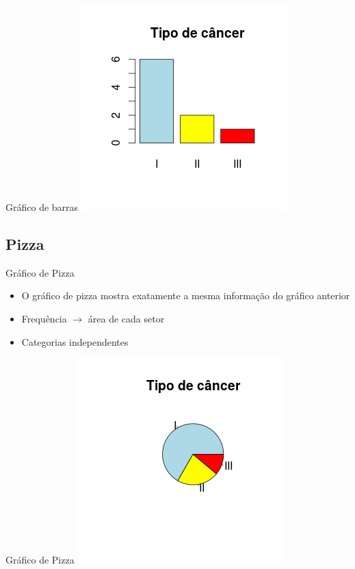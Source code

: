 \documentclass{beamer}
\begin{document}
\begin{frame}{Gráfico de barras}
  \centering\includegraphics[height=\textheight]{Desc_I/barras}
\end{frame}

\subsection{Pizza}

\begin{frame}{Gráfico de Pizza}
  \begin{itemize}
  \item O gráfico de pizza mostra \alert{exatamente} a mesma informação do gráfico anterior
  \item Frequência $\rightarrow$ área de cada setor
  \item Categorias independentes
  \end{itemize}
\end{frame}

\begin{frame}{Gráfico de Pizza}
  \centering\includegraphics[height=\textheight]{Desc_I/pizza}
\end{frame}
\end{document}
